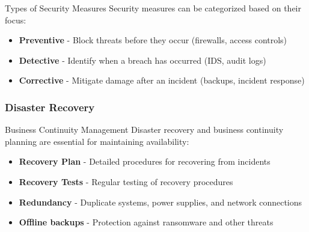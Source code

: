 \begin{definition}{Types of Security Measures}
Security measures can be categorized based on their focus:
\begin{itemize}
    \item \textbf{Preventive} - Block threats before they occur (firewalls, access controls)
    \item \textbf{Detective} - Identify when a breach has occurred (IDS, audit logs)
    \item \textbf{Corrective} - Mitigate damage after an incident (backups, incident response)
\end{itemize}
\end{definition}

\multend

\subsubsection{Disaster Recovery}



\begin{concept}{Business Continuity Management}
Disaster recovery and business continuity planning are essential for maintaining availability:
\begin{itemize}
    \item \textbf{Recovery Plan} - Detailed procedures for recovering from incidents
    \item \textbf{Recovery Tests} - Regular testing of recovery procedures
    \item \textbf{Redundancy} - Duplicate systems, power supplies, and network connections
    \item \textbf{Offline backups} - Protection against ransomware and other threats
\end{itemize}
\end{concept}

